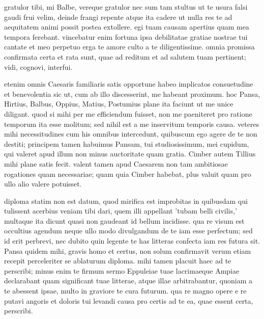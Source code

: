 


 gratulor tibi, mi Balbe, vereque gratulor nec sum tam stultus ut te usura falsi gaudi frui velim, deinde frangi repente atque ita cadere ut nulla res te ad aequitatem animi possit postea extollere. egi tuam causam apertius quam mea tempora ferebant. vincebatur enim fortuna ipsa debilitatae gratiae nostrae tui cantate et meo perpetuo erga te amore culto a te diligentissime. omnia promissa confirmata certa et rata sunt, quae ad reditum et ad salutem tuam pertinent; vidi, cognovi, interfui.

 etenim omnis Caesaris familiaris satis opportune habeo implicatos consuetudine et benevolentia sic ut, cum ab illo discesserint, me habeant proximum. hoc Pansa, Hirtius, Balbus, Oppius, Matius, Postumius plane ita faciunt ut me unice diligant. quod si mihi per me efficiendum fuisset, non me paeniteret pro ratione temporum ita esse molitum; sed nihil est a me inservitum temporis causa. veteres mihi necessitudines cum his omnibus intercedunt, quibuscum ego agere de te non destiti; principem tamen habuimus Pansam, tui studiosissimum, mei cupidum, qui valeret apud illum non minus auctoritate quam gratia. Cimber autem Tillius mihi plane satis fecit. valent tamen apud Caesarem non tam ambitiosae rogationes quam necessariae; quam quia Cimber habebat, plus valuit quam pro ullo alio valere potuisset.

 diploma statim non est datum, quod mirifica est improbitas in quibusdam qui tulissent acerbius veniam tibi dari, quem illi appellant 'tubam belli civilis,' multaque ita dicunt quasi non gaudeant id bellum incidisse. qua re visum est occultius agendum neque ullo modo divulgandum de te iam esse perfectum; sed id erit perbrevi, nec dubito quin legente te has litteras confecta iam res futura sit. Pansa quidem mihi, gravis homo et certus, non solum confirmavit verum etiam recepit perceleriter se ablaturum diploma. mihi tamen placuit haec ad te perscribi; minus enim te firmum sermo Eppuleiae tuae lacrimaeque Ampiae declarabant quam significant tuae litterae, atque illae arbitrabantur, quoniam a te abessent ipsae, multo in graviore te cura futurum. qua re magno opere e re putavi angoris et doloris tui levandi causa pro certis ad te ea, quae essent certa, perscribi.

